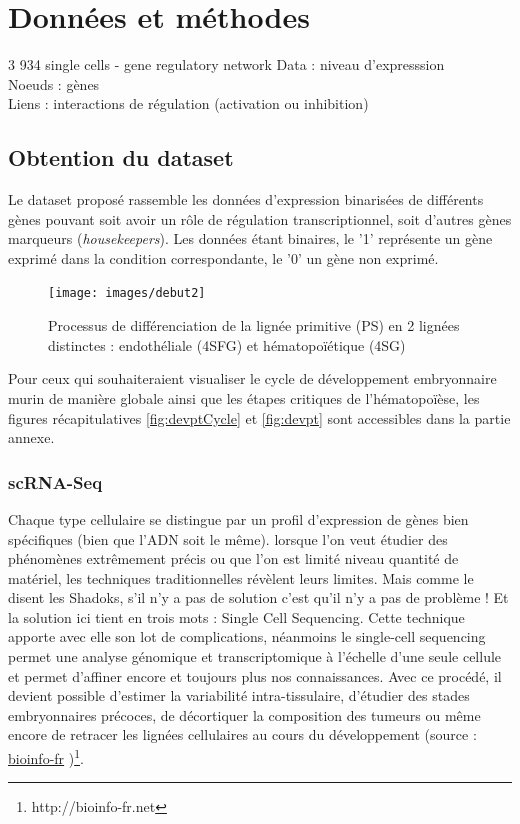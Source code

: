 \documentclass[fleqn,11pt]{SelfArx} %
\begin{document}

\section{Données et méthodes}


3 934 single cells - gene regulatory network
Data : niveau d'expresssion \\
Noeuds : gènes \\
Liens : interactions de régulation (activation ou inhibition) 
\subsection{Obtention du dataset}
Le dataset proposé rassemble les données d'expression binarisées de différents gènes pouvant soit avoir un rôle de régulation transcriptionnel, soit d'autres gènes marqueurs (\textit{housekeepers}). Les données étant binaires, le '1' représente un gène exprimé dans la condition correspondante, le '0' un gène non exprimé. 



\begin{figure}[ht]
\centering
\texttt{[image: images/debut2]}
\caption{Processus de différenciation de la lignée primitive (PS) en 2 lignées distinctes : endothéliale (4SFG) et hématopoïétique (4SG)}
\label{fig:debut}
\end{figure}

Pour ceux qui souhaiteraient visualiser le cycle de développement embryonnaire murin de manière globale ainsi que les étapes critiques de l'hématopoïèse, les figures récapitulatives \ref{fig:devptCycle} et \ref{fig:devpt} sont accessibles dans la partie annexe. 


\subsubsection{scRNA-Seq}
Chaque type cellulaire se distingue par un profil d'expression de gènes bien spécifiques (bien que l'ADN soit le même). lorsque l'on veut étudier des phénomènes extrêmement précis ou que l'on est limité niveau quantité de matériel, les techniques traditionnelles révèlent leurs limites. Mais comme le disent les Shadoks, s'il n'y a pas de solution c'est qu'il n'y a pas de problème ! Et la solution ici tient en trois mots : Single Cell Sequencing. Cette technique apporte avec elle son lot de complications, néanmoins le single-cell sequencing permet une analyse génomique et transcriptomique à l'échelle d'une seule cellule et permet d'affiner encore et toujours plus nos connaissances. Avec ce procédé, il devient possible d'estimer la variabilité intra-tissulaire, d'étudier des stades embryonnaires précoces, de décortiquer la composition des tumeurs ou même encore de retracer les lignées cellulaires au cours du développement (source : \href{http://bioinfo-fr.net/single-cell-sequencing?hilite=single+cell+RNA-seq}{bioinfo-fr} )\footnote{http://bioinfo-fr.net}. 
\end{document}
